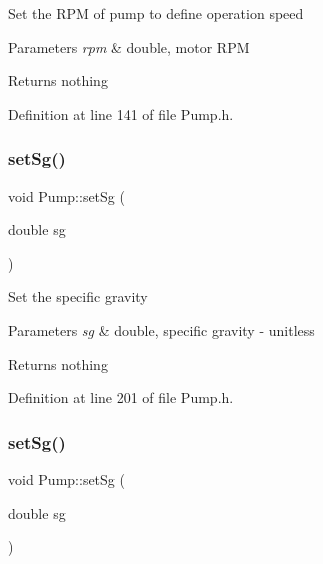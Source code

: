 Set the R\+PM of pump to define operation speed


\begin{DoxyParams}{Parameters}
{\em rpm} & double, motor R\+PM\\
\hline
\end{DoxyParams}
\begin{DoxyReturn}{Returns}
nothing 
\end{DoxyReturn}


Definition at line 141 of file Pump.\+h.

\mbox{\label{class_pump_a9b9773b74e0e56acece38107ab547728}} 
\subsubsection{\texorpdfstring{set\+Sg()}{setSg()}\hspace{0.1cm}{\footnotesize\ttfamily [1/3]}}
{\footnotesize\ttfamily void Pump\+::set\+Sg (\begin{DoxyParamCaption}\item[{double}]{sg }\end{DoxyParamCaption})\hspace{0.3cm}{\ttfamily [inline]}}

Set the specific gravity


\begin{DoxyParams}{Parameters}
{\em sg} & double, specific gravity -\/ unitless\\
\hline
\end{DoxyParams}
\begin{DoxyReturn}{Returns}
nothing 
\end{DoxyReturn}


Definition at line 201 of file Pump.\+h.

\mbox{\label{class_pump_a9b9773b74e0e56acece38107ab547728}} 
\subsubsection{\texorpdfstring{set\+Sg()}{setSg()}\hspace{0.1cm}{\footnotesize\ttfamily [2/3]}}
{\footnotesize\ttfamily void Pump\+::set\+Sg (\begin{DoxyParamCaption}\item[{double}]{sg }\end{DoxyParamCaption})\hspace{0.3cm}{\ttfamily [inline]}}

